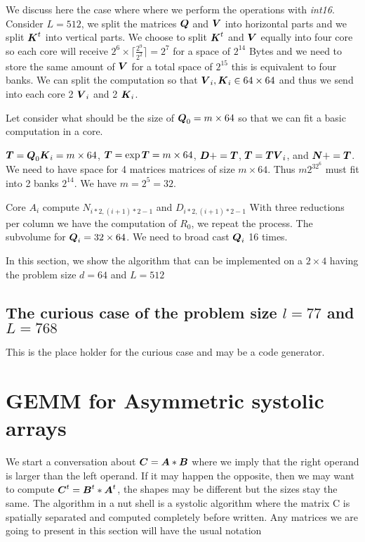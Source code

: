 \documentclass[journal]{IEEEtran}
\begin{document}
We discuss here the case where where we perform the operations with
{\em int16}. Consider $L=512$, we split the matrices ${\boldsymbol Q}$ and
${\boldsymbol V}$ into horizontal parts and we split ${\boldsymbol K}^t$ into vertical
parts. We choose to split ${\boldsymbol K}^t$ and ${\boldsymbol V}$ equally into four
core so each core will receive $2^6\times
\lceil\frac{2^9}{2^2}\rceil=2^7$ for a space of $2^{14}$ Bytes and we
need to store the same amount of ${\boldsymbol V}$ for a total space of
$2^{15}$ this is equivalent to four banks. We can split the
computation so that ${\boldsymbol V}_i, {\boldsymbol K}_i \in 64\times 64$ and thus we
send into each core 2 ${\boldsymbol V}_i$ and 2 ${\boldsymbol K}_i$.

Let consider what should be the size of ${\boldsymbol Q}_0 = m \times 64$ so
that we can fit a basic computation in a core.

${\boldsymbol T} = {\boldsymbol Q}_0{\boldsymbol K}_i = m \times 64$, 
${\boldsymbol T} = \exp{{\boldsymbol T}} = m \times 64$,
${\boldsymbol D} += {\boldsymbol T}$, ${\boldsymbol T} = {\boldsymbol T}{\boldsymbol V}_i$, and ${\boldsymbol N} +=
{\boldsymbol T}$. We need to have space for 4 matrices matrices of size $ m
\times 64$. Thus $m2^32^6$ must fit into 2 banks $2^{14}$.  We have $m
= 2^5 = 32$.

Core $A_i$ compute $N_{i*2,(i+1)*2 -1}$ and $D_{i*2,(i+1)*2 -1}$ With
three reductions per column we have the computation of $R_0$, we
repeat the process.  The subvolume for ${\boldsymbol Q}_i = 32\times 64$.  We
need to broad cast ${\boldsymbol Q}_i$ 16 times.



In this section, we show the algorithm that can be implemented on a
$2\times 4$ having the problem size $d=64$ and $L=512$



\subsection{The curious case of the problem size $l=77$ and $L=768$}

This is the place holder for the curious case and may be a code
generator. 


\newpage
\section{GEMM for Asymmetric systolic arrays}

We start a conversation about ${\boldsymbol C} = {\boldsymbol A}*{\boldsymbol B}$ where we imply
that the right operand is larger than the left operand. If it may
happen the opposite, then we may want to compute ${\boldsymbol C}^t =
{\boldsymbol B}^t*{\boldsymbol A}^t$, the shapes may be different but the sizes stay the
same. The algorithm in a nut shell is a systolic algorithm where the
matrix C is spatially separated and computed completely before
written. Any matrices we are going to present in this section will
have the usual notation
\end{document}
